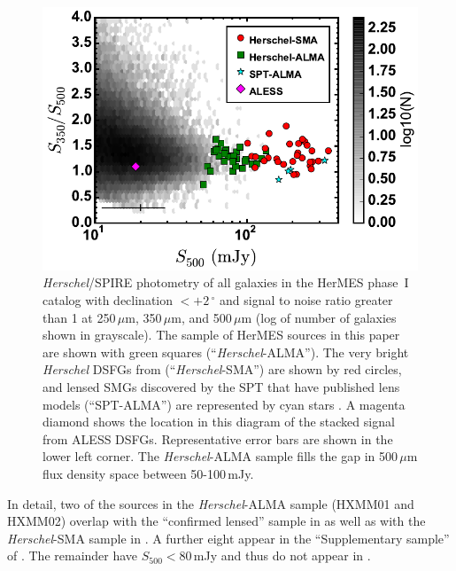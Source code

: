 \documentclass[iop]{emulateapj}
\begin{document}
\begin{figure}[!tbp] 
\includegraphics[width=\linewidth]{spirecolflux.pdf}

\caption{ {\it Herschel}/SPIRE photometry of all galaxies in the HerMES phase~I
catalog with declination $< +2\,^\circ$ and signal to noise ratio greater than
1 at 250$\,\mu$m, 350$\,\mu$m, and 500$\,\mu$m (log of number of galaxies shown
in grayscale).  The sample of HerMES sources in this paper are shown with green
squares (``{\it Herschel}-ALMA'').  The very bright {\it Herschel} DSFGs from
\citet{Bussmann:2013lr} (``{\it Herschel}-SMA'') are shown by red circles, and
lensed SMGs discovered by the SPT that have published lens models
(``SPT-ALMA'') are represented by cyan stars \citep{Hezaveh:2013fk}.  A magenta
diamond shows the location in this diagram of the stacked signal from ALESS
DSFGs.  Representative error bars are shown in the lower left corner.  The {\it
Herschel}-ALMA sample fills the gap in 500$\,\mu$m flux density space between
50-100$\,$mJy.} \label{fig:sample}

\end{figure}

In detail, two of the sources in the {\it Herschel}-ALMA sample (HXMM01 and
HXMM02) overlap with the ``confirmed lensed'' sample in \citet{Wardlow:2013lr}
as well as with the {\it Herschel}-SMA sample in \citet{Bussmann:2013lr}.  A
further eight appear in the ``Supplementary sample'' of \citet{Wardlow:2013lr}.
The remainder have $S_{500} < 80\,$mJy and thus do not appear in
\citet{Wardlow:2013lr}.
\end{document}
